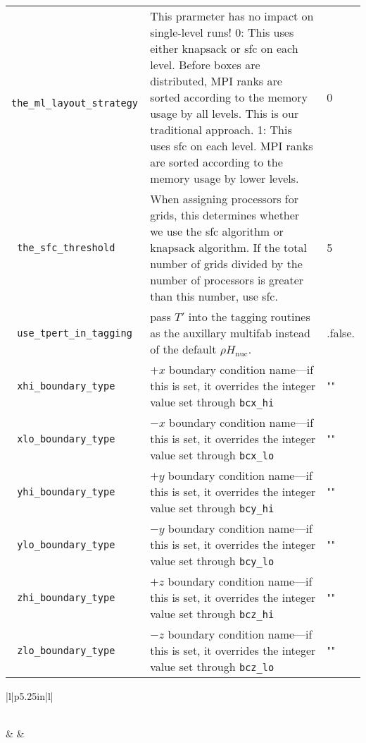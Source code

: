 \begin{landscape}
{\begin{center}
\begin{longtable}{|l|p{5.25in}|l|}
\verb= the_ml_layout_strategy = &  This prarmeter has no impact on single-level runs! 0: This uses either knapsack or sfc on each level.  Before boxes are    distributed, MPI ranks are sorted according to the memory usage by    all levels.  This is our traditional approach. 1: This uses sfc on each level.  MPI ranks are sorted according to the    memory usage by lower levels. & 0 \\
\verb= the_sfc_threshold = &  When assigning processors for grids, this determines whether we use the sfc algorithm or knapsack algorithm.  If the total number of grids divided by the number of processors is greater than this number, use sfc. & 5 \\
\rowcolor{tableShade}
\verb= use_tpert_in_tagging = &  pass $T'$ into the tagging routines as the auxillary multifab instead of the default $\rho H_\mathrm{nuc}$. & .false. \\
\verb= xhi_boundary_type = &  $+x$ boundary condition name---if this is set, it overrides the integer value set through {\tt bcx\_hi} & "" \\
\rowcolor{tableShade}
\verb= xlo_boundary_type = &  $-x$ boundary condition name---if this is set, it overrides the integer value set through {\tt bcx\_lo} & "" \\
\verb= yhi_boundary_type = &  $+y$ boundary condition name---if this is set, it overrides the integer value set through {\tt bcy\_hi} & "" \\
\rowcolor{tableShade}
\verb= ylo_boundary_type = &  $-y$ boundary condition name---if this is set, it overrides the integer value set through {\tt bcy\_lo} & "" \\
\verb= zhi_boundary_type = &  $+z$ boundary condition name---if this is set, it overrides the integer value set through {\tt bcz\_hi} & "" \\
\rowcolor{tableShade}
\verb= zlo_boundary_type = &  $-z$ boundary condition name---if this is set, it overrides the integer value set through {\tt bcz\_lo} & "" \\


\end{longtable}
\end{center}

} %


{\small

\renewcommand{\arraystretch}{1.5}
%
\begin{center}
\begin{longtable}{|l|p{5.25in}|l|}
\caption[ heating
 parameters.]{ heating
 parameters.} \label{table:  heating
 parameters. runtime} \\
%
\hline {} &
        &
        \\ \hline
\endfirsthead


\end{longtable}
\end{center}}
\end{landscape}
